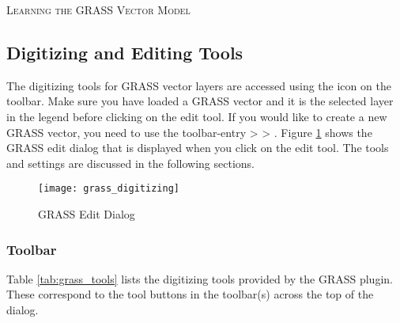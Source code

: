 \begin{Tip}\caption{\textsc{Learning the GRASS Vector Model}}
\end{Tip} 

\subsection{Digitizing and Editing Tools}
\label{grass_digitising}

The digitizing tools for GRASS vector layers are accessed using the
 icon on the toolbar. Make sure
you have loaded a GRASS vector and it is the selected layer in the legend before
clicking on the edit tool. If you would like to create a new GRASS vector, 
you need to use the toolbar-entry  >
 > . Figure \ref{fig:grass_digitizing} shows the GRASS edit dialog
that is displayed when you click on the edit tool. The tools and settings are
discussed in the following sections.

\begin{figure}[h]
   \begin{center}
   \caption{GRASS Edit Dialog}\label{fig:grass_digitizing}\smallskip
   \texttt{[image: grass\_digitizing]}
\end{center}  
\end{figure}

\subsubsection{Toolbar}\label{label_grasstoolbar}

Table \ref{tab:grass_tools} lists the digitizing tools provided by the GRASS
plugin. These correspond to the tool buttons in the toolbar(s) across the top
of the dialog.

